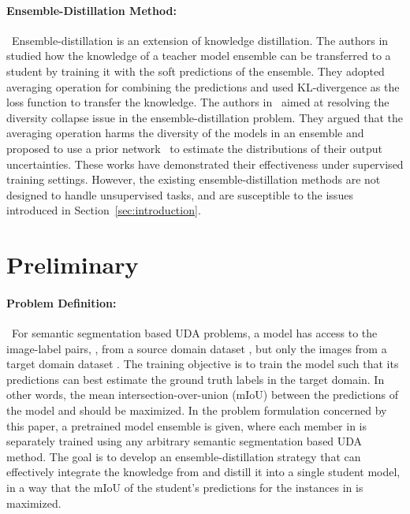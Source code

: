 \documentclass[final]{cvpr}
\begin{document}
\paragraph{Ensemble-Distillation Method:}~Ensemble-distillation is an extension of knowledge distillation. The authors in~\cite{hinton2015distilling,balan2015bayesian} studied how the knowledge of a teacher model ensemble can be transferred to a student by training it with the soft predictions of the ensemble. They adopted averaging operation for combining the predictions and used KL-divergence as the loss function to transfer the knowledge. The authors in~\cite{malinin2019ensemble} aimed at resolving the diversity collapse issue in the ensemble-distillation problem. They argued that the averaging operation harms the diversity of the models in an ensemble and proposed to use a prior network~\cite{malinin2018predictive} to estimate the distributions of their output uncertainties. These works have demonstrated their effectiveness under supervised training settings. However, the existing ensemble-distillation methods are not designed to handle unsupervised tasks, and are susceptible to the issues introduced in Section~\ref{sec:introduction}. 
\section{Preliminary}
\label{sec:preliminary}
\paragraph{Problem Definition:}~For semantic segmentation based UDA problems, a model has access to the image-label pairs, , from a source domain dataset , but only the images  from a target domain dataset . The training objective is to train the model such that its predictions can best estimate the ground truth labels  in the target domain. In other words, the mean intersection-over-union (mIoU) between the predictions of the model and  should be maximized. In the problem formulation concerned by this paper, a pretrained model ensemble  is given, where each member in  is separately trained using any arbitrary semantic segmentation based UDA method. The goal is to develop an ensemble-distillation strategy that can effectively integrate the knowledge from  and distill it into a single student model, in a way that the mIoU of the student's predictions for the instances in  is maximized.
\end{document}
